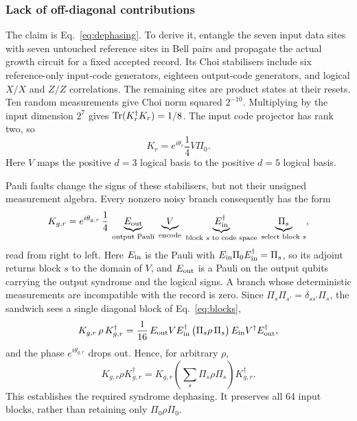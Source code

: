 \subsubsection{Lack of off-diagonal contributions}
\label{subsubsec:off-diag}
The claim is Eq.~\eqref{eq:dephasing}. To derive it, entangle the seven input data sites with seven untouched reference sites in Bell pairs and propagate the actual growth circuit for a fixed accepted record.
Its Choi stabilisers include six reference-only input-code generators, eighteen output-code generators, and logical $X/X$ and $Z/Z$ correlations. The remaining sites are product states at their resets. Ten random measurements give Choi norm squared $2^{-10}$. Multiplying by the input dimension $2^7$ gives $\operatorname{Tr}(K_r^\dagger K_r)=1/8$. The input code projector has rank two, so
\begin{equation}
 K_r=e^{i\theta_r}\frac14 V\Pi_0.
 \label{eq:choi}
\end{equation}
Here $V$ maps the positive $d=3$ logical basis to the positive $d=5$ logical basis.

Pauli faults change the signs of these stabilisers, but not their unsigned measurement algebra. Every nonzero noisy branch consequently has the form
\begin{equation}
 K_{g,r}=e^{i\theta_{g,r}}\,\frac14\,
 \underbrace{E_{\rm out}}_{\text{output Pauli}}\;
 \underbrace{V}_{\text{encode}}\;
 \underbrace{E_{\rm in}^\dagger}_{\text{block $s$ to code space}}\;
 \underbrace{\Pi_s}_{\text{select block $s$}} ,
 \label{eq:noisychoi}
\end{equation}
read from right to left. Here $E_{\rm in}$ is the Pauli with $E_{\rm in}\Pi_0E_{\rm in}^\dagger=\Pi_s$, so its adjoint returns block $s$ to the domain of $V$, and $E_{\rm out}$ is a Pauli on the output qubits carrying the output syndrome and the logical signs. A branch whose deterministic measurements are incompatible with the record is zero. Since $\Pi_s\Pi_{s'}=\delta_{ss'}\Pi_s$, the sandwich sees a single diagonal block of Eq.~\eqref{eq:blocks},
\begin{equation}
 K_{g,r}\,\rho\,K_{g,r}^\dagger
 =\frac1{16}\,E_{\rm out}VE_{\rm in}^\dagger\,\big(\Pi_s\rho\,\Pi_s\big)\,E_{\rm in}V^\dagger E_{\rm out}^\dagger ,
 \label{eq:oneblock}
\end{equation}
and the phase $e^{i\theta_{g,r}}$ drops out. Hence, for arbitrary $\rho$,
\begin{equation}
 K_{g,r}\rho K_{g,r}^\dagger
 =K_{g,r}\left(\sum_s\Pi_s\rho\Pi_s\right)K_{g,r}^\dagger.
 \label{eq:dephasing}
\end{equation}
This establishes the required syndrome dephasing. It preserves all 64 input blocks, rather than retaining only $\Pi_0\rho\Pi_0$.

